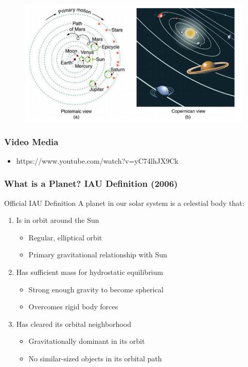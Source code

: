 \documentclass{beamer}
\begin{document}
\begin{frame}
\begin{figure}
    \centering
    \includegraphics[width=1\linewidth]{phys12-circuits-circuit-model-views.png}
\end{figure}
\end{frame}


\begin{frame}
\frametitle{Video Media}
\begin{itemize}
  \item https://www.youtube.com/watch?v=yC74lhJX9Ck
\end{itemize}
\end{frame}


\begin{frame}
\frametitle{What is a Planet? IAU Definition (2006)}

\begin{block}{Official IAU Definition}
A planet in our solar system is a celestial body that:
\end{block}

\begin{enumerate}
    \item Is in orbit around the Sun
    \begin{itemize}
        \item Regular, elliptical orbit
        \item Primary gravitational relationship with Sun
    \end{itemize}
    
    \item Has sufficient mass for hydrostatic equilibrium
    \begin{itemize}
        \item Strong enough gravity to become spherical
        \item Overcomes rigid body forces
    \end{itemize}
    
    \item Has cleared its orbital neighborhood
    \begin{itemize}
        \item Gravitationally dominant in its orbit
        \item No similar-sized objects in its orbital path
    \end{itemize}
\end{enumerate}
\end{frame}
\end{document}
